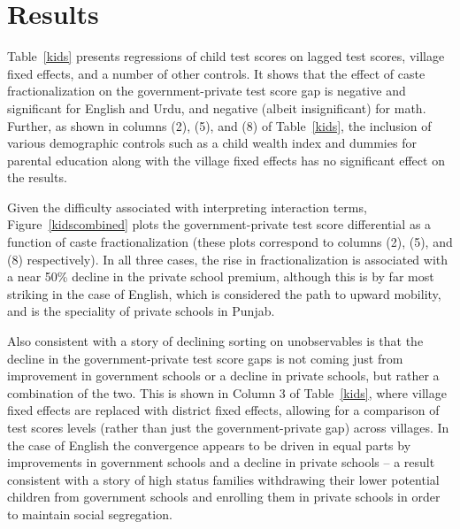 \documentclass[12pt]{article}
\begin{document}



\section{Results}\label{results}
Table~\ref{kids} presents regressions of child test scores on lagged test scores, village fixed effects, and a number of other controls. It shows that the effect of caste fractionalization on the government-private test score gap is negative and significant for English and Urdu, and negative (albeit insignificant) for math. Further, as shown in columns (2), (5), and (8) of Table~\ref{kids}, the inclusion of various demographic controls such as a child wealth index and dummies for parental education along with the village fixed effects has no significant effect on the results. 

Given the difficulty associated with interpreting interaction terms, Figure~\ref{kidscombined} plots the government-private test score differential as a function of caste fractionalization (these plots correspond to columns (2), (5), and (8) respectively). In all three cases, the rise in fractionalization is associated with a near 50\% decline in the private school premium, although this is by far most striking in the case of English, which is considered the path to upward mobility, and is the speciality of private schools in Punjab. 

Also consistent with a story of declining sorting on unobservables is that the decline in the government-private test score gaps is not coming just from improvement in government schools or a decline in private schools, but rather a combination of the two. This is shown in Column 3 of Table~\ref{kids}, where village fixed effects are replaced with district fixed effects, allowing for a comparison of test scores levels (rather than just the government-private gap) across villages. In the case of English the convergence appears to be driven in equal parts by improvements in government schools and a decline in private schools -- a result consistent with a story of high status families withdrawing their lower potential children from government schools and enrolling them in private schools in order to maintain social segregation. 
\end{document}
